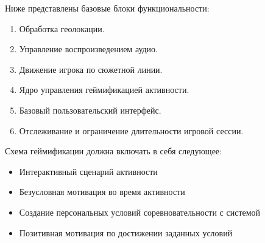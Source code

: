 Ниже представлены базовые блоки функциональности:
\begin{enumerate}
	\item Обработка геолокации.
	\item Управление воспроизведением аудио.
	\item Движение игрока по сюжетной линии.
	\item Ядро управления геймификацией активности.
	\item Базовый пользовательский интерфейс.
	\item Отслеживание и ограничение длительности игровой сессии.
\end{enumerate}
\smallskip
Схема геймификации должна включать в себя следующее:
\begin{itemize}
	\item Интерактивный сценарий активности
	\item Безусловная мотивация во время активности
	\item Создание персональных условий соревновательности с системой
	\item Позитивная мотивация по достижении заданных условий
\end{itemize}